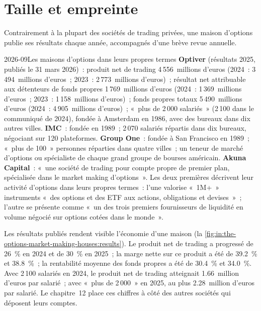 \section{Taille et empreinte}

Contrairement à la plupart des sociétés de trading privées, une maison d'options publie ses résultats chaque année, accompagnés d'une brève revue annuelle.

\begin{dated}{2026-09}{Les maisons d'options dans leurs propres termes}\label{dat:in:the-options-market-making-houses:houses}
\textbf{Optiver} (résultats 2025, publiés le 31 mars 2026)~: produit net de trading 4\,556~millions d'euros (2024~: 
3\,494~millions d'euros~; 2023~: 2\,773~millions d'euros)~; résultat net attribuable aux détenteurs de fonds propres 1\,769~millions d'euros (2024~: 
1\,369~millions d'euros~; 2023~: 1\,158~millions d'euros)~; fonds propres totaux 5\,490~millions d'euros (2024~: 4\,905~millions d'euros)~; «~plus de 2\,000
salariés~» (2\,100 dans le communiqué de 2024), fondée à Amsterdam en 1986, avec des bureaux dans dix autres villes.
\textbf{IMC}~: fondée en 1989~; 2\,070 salariés répartis dans dix bureaux, négociant sur 120 plateformes.
\textbf{Group One}~: fondée à San Francisco en 1989~; «~plus de 100~» personnes réparties dans quatre villes~; un teneur de marché d'options ou
spécialiste de chaque grand groupe de bourses américain. \textbf{Akuna Capital}~: «~une société de trading pour compte propre de premier plan, spécialisée
dans le market making d'options~». Les deux premières décrivent leur activité d'options dans leurs propres termes~: l'une valorise «~1M+~»
instruments «~des options et des ETF aux actions, obligations et devises~»~; l'autre se présente comme «~un des trois premiers
fournisseurs de liquidité en volume négocié sur options cotées dans le monde~».
\end{dated}

Les résultats publiés rendent visible l'économie d'une maison (la \cref{fig:in:the-options-market-making-houses:results}).
Le produit net de trading a progressé de 26~\% en 2024 et de 30~\% en 2025~; la marge nette sur ce produit a été de 39.2~\% et 38.8~\%~; la
rentabilité moyenne des fonds propres a été de 30.4~\% et 34.0~\%. Avec 2\,100 salariés en 2024, le produit net de trading atteignait 1.66~million d'euros
par salarié~; avec «~plus de 2\,000~» en 2025, au plus 2.28~million d'euros par salarié. Le chapitre~12 place ces chiffres à côté
des autres sociétés qui déposent leurs comptes.

